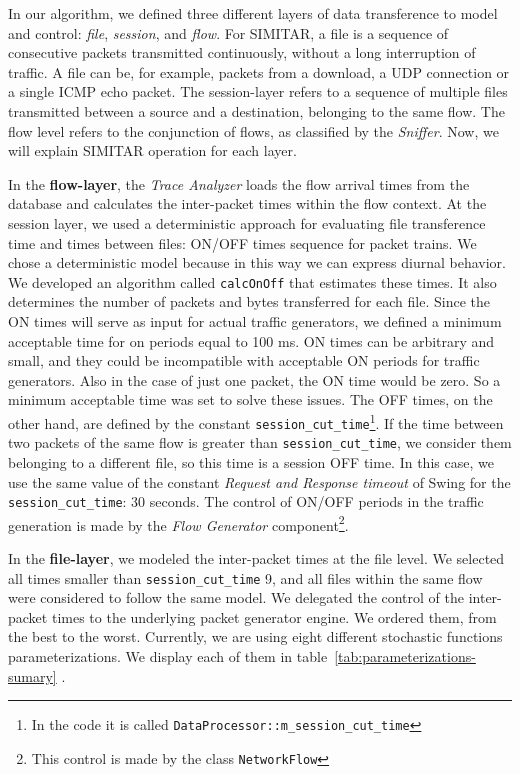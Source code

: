 In our algorithm, we defined three different layers of data transference to model and control: \textit{file}, \textit{session}, and \textit{flow}. For SIMITAR, a file is a sequence of consecutive packets transmitted continuously, without a long interruption of traffic. A file can be, for example, packets from a download, a UDP connection or a single \acrshort{ICMP} echo packet. The session-layer refers to a sequence of multiple files transmitted between a source and a destination, belonging to the same flow. The flow level refers to the conjunction of flows, as classified by the \textit{Sniffer}. Now, we will explain SIMITAR operation for each layer.

In the \textbf{flow-layer}, the \textit{Trace Analyzer}  loads the flow arrival times from the database and calculates the inter-packet times within the flow context. At the session layer, we used a deterministic approach for evaluating file transference time and times between files: ON/OFF times sequence for packet trains. We chose a deterministic model because in this way we can express diurnal behavior. We developed an algorithm called \texttt{calcOnOff} that estimates these times. It also determines the number of packets and bytes transferred for each file. Since the ON times will serve as input for actual traffic generators, we defined a minimum acceptable time for on periods equal to 100 ms. ON times can be arbitrary and small, and they could be incompatible with acceptable ON periods for traffic generators. Also in the case of just one packet, the ON time would be zero. So  a minimum acceptable time was set to solve these issues. The OFF times, on the other hand, are defined by the constant \texttt{session\_cut\_time}\footnote{In the code it is called \texttt{DataProcessor::m\_session\_cut\_time} }. If the time between two packets of the same flow is greater than \texttt{session\_cut\_time}, we consider them belonging to a different file, so this time is a session OFF time. In this case, we use the same value of the constant \textit{Request and Response timeout} of Swing\cite{swing-paper} for the \texttt{session\_cut\_time}: 30 seconds. The control of ON/OFF periods in the traffic generation is made by the \textit{Flow Generator} component\footnote{This control is made by the class \texttt{NetworkFlow}}.

In the \textbf{file-layer}, we modeled the inter-packet times at the file level. We selected all times smaller than \texttt{session\_cut\_time} 9, and all files within the same flow were considered to follow the same model. We delegated the control of the inter-packet times to the underlying packet generator engine. We ordered them, from the best to the worst. Currently, we are using eight different stochastic functions parameterizations. We display each of them in table~\ref{tab:parameterizations-sumary} .

